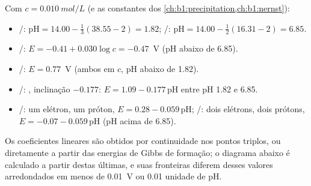 \begin{example}\label{ex:b1:e-ph-diagrams:iron}
Com $c = \qty{0.010}{mol/L}$ (e as constantes dos \cref{ch:b1:precipitation,ch:b1:nernst}):
\begin{itemize}
  \item {}/: $\mathrm{pH} = 14.00 - \frac13(38.55 - 2) = 1.82$;
        /: $\mathrm{pH} = 14.00 - \frac12(16.31 - 2) = 6.85$.
  \item {}/: $E = -0.41 + 0.030\log c = -0.47$~V (pH abaixo de 6.85).
  \item {}/: $E = 0.77$~V (ambos em $c$, pH abaixo de 1.82).
  \item {}/: , inclinação
        $-0.177$: $E = 1.09 - 0.177\,\mathrm{pH}$ entre pH 1.82 e 6.85.
  \item {}/: um elétron, um próton, $E = 0.28 -
        0.059\,\mathrm{pH}$; /: dois elétrons, dois
        prótons, $E = -0.07 - 0.059\,\mathrm{pH}$ (pH acima de 6.85).
\end{itemize}
Os coeficientes lineares são obtidos por continuidade nos pontos triplos,
ou diretamente a partir das energias de Gibbs de formação; o diagrama
abaixo é calculado a partir destas últimas, e suas fronteiras diferem
desses valores arredondados em menos de \qty{0.01}{V} ou 0.01 unidade de
pH.
\end{example}

